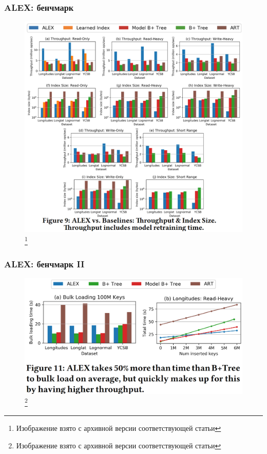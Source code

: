\documentclass{beamer}
\begin{document}
\begin{frame}
	\frametitle{ALEX: бенчмарк}
	\begin{figure}[htb]
	\includegraphics[width=\textwidth,height=0.8\textheight,keepaspectratio]{alex-bench-1.png} 
	\footnote{\tiny{Изображение взято с архивной версии соответствующей статьи}}
	\end{figure}	
\end{frame}

\begin{frame}
	\frametitle{ALEX: бенчмарк II}
	\begin{figure}[htb]
	\includegraphics[width=\textwidth,height=0.8\textheight,keepaspectratio]{alex-bench-2.png} 
	\footnote{\tiny{Изображение взято с архивной версии соответствующей статьи}}
\end{figure}	
	

	
\end{frame}
\end{document}
